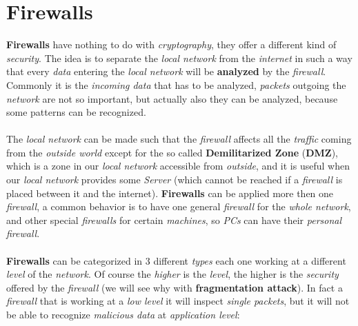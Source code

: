 \documentclass{article}
\begin{document}
\section{Firewalls}
\textbf{Firewalls} have nothing to do with \emph{cryptography}, they offer a different kind of \emph{security}. The idea is to separate the \emph{local network} from the \emph{internet} in such a way that every \emph{data} entering the \emph{local network} will be \textbf{analyzed} by the \emph{firewall}. Commonly it is the \emph{incoming data} that has to be analyzed, \emph{packets} outgoing the \emph{network} are not so important, but actually also they can be analyzed, because some patterns can be recognized. \\\\
The \emph{local network} can be made such that the \emph{firewall} affects all the \emph{traffic} coming from the \emph{outside world} except for the so called \textbf{Demilitarized Zone} (\textbf{DMZ}), which is a zone in our \emph{local network} accessible from \emph{outside}, and it is useful when our \emph{local network} provides some \emph{Server} (which cannot be reached if a \emph{firewall} is placed between it and the internet). \textbf{Firewalls} can be applied more then one \emph{firewall}, a common behavior is to have one general \emph{firewall} for the \emph{whole network}, and other special \emph{firewalls} for certain \emph{machines}, so \emph{PCs} can have their \emph{personal firewall}. \\\\
\textbf{Firewalls} can be categorized in 3 different \emph{types} each one working at a different \emph{level }of the \emph{network}. Of course the \emph{higher} is the \emph{level}, the higher is the \emph{security} offered by the \emph{firewall} (we will see why with \textbf{fragmentation attack}). In fact a \emph{firewall} that is working at a \emph{low level} it will inspect \emph{single packets}, but it will not be able to recognize \emph{malicious data} at \emph{application level}:
\end{document}
